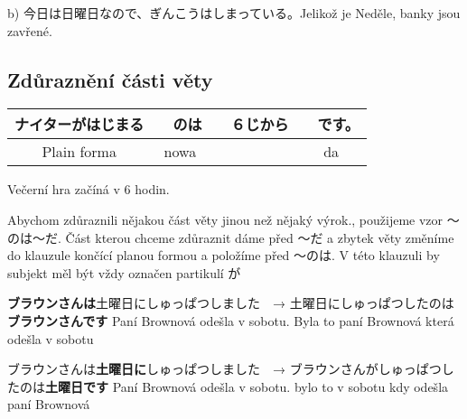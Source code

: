 b) 今日は日曜日なので、ぎんこうはしまっている。Jelikož je Neděle, banky jsou zavřené.



\subsection{Zdůraznění části věty}

\begin{center}
\begin{tabular}{||c|c||c|c||}
\hline
ナイターがはじまる&　のは&　６じから&　です。\\
\hline
Plain forma & nowa&&da\\
\hline
\end{tabular}
\end{center}
Večerní hra začíná v 6 hodin.

Abychom zdůraznili nějakou část věty jinou než nějaký výrok., použijeme vzor 〜のは〜だ. Část kterou chceme zdůraznit dáme před  〜だ a zbytek věty změníme do klauzule končící planou formou a položíme před 〜のは. V této klauzuli by subjekt měl být vždy označen partikulí が

\textbf{ブラウンさんは}土曜日にしゅっぱつしました　→ 土曜日にしゅっぱつしたのは\textbf{ブラウンさんです}
Paní Brownová odešla v sobotu.        Byla to paní Brownová která odešla v sobotu

ブラウンさんは\textbf{土曜日に}しゅっぱつしました　→  ブラウンさんがしゅっぱつしたのは\textbf{土曜日です}
Paní Brownová odešla v sobotu.                  bylo to v sobotu kdy odešla paní Brownová


